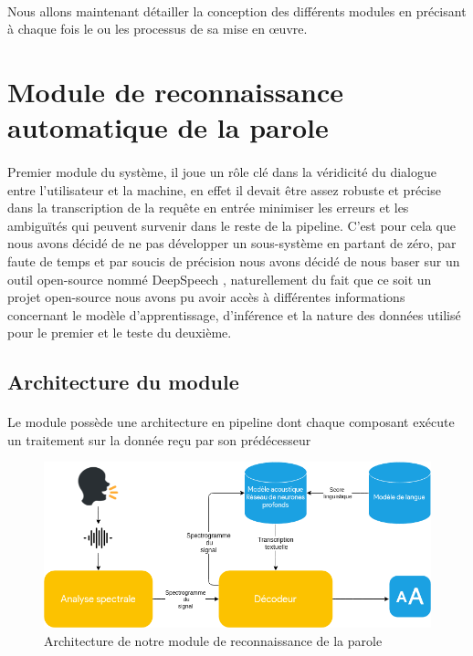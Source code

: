 	\paragraph{}
	Nous allons maintenant détailler la conception des différents modules en précisant à chaque fois le ou les processus de sa mise en œuvre. 
\section{Module de reconnaissance automatique de la parole}
\paragraph{}
Premier module du système, il joue un rôle clé dans la véridicité du dialogue entre l'utilisateur et la machine, en effet il devait être assez robuste et précise dans la transcription de la requête en entrée minimiser les erreurs et les ambiguïtés qui peuvent survenir dans le reste de la pipeline. C'est pour cela que nous avons décidé de ne pas développer un sous-système en partant de zéro, par faute de temps et par soucis de précision nous avons décidé de nous baser sur un outil open-source nommé DeepSpeech \cite{deepspeech_paper}, naturellement du fait que ce soit un projet open-source nous avons pu avoir accès à différentes informations concernant le modèle d'apprentissage, d'inférence et la nature des données utilisé pour le premier et le teste du deuxième.
	\subsection{Architecture du module}
	\paragraph{}
	Le module possède une architecture en pipeline dont chaque composant exécute un traitement sur la donnée reçu par son prédécesseur
	\begin{figure}[H] 
		\centering
		\includegraphics[width=0.88\linewidth]{images/Conception/ASR/schema.png}
		\caption{Architecture de notre module de reconnaissance de la parole}
	\end{figure}
